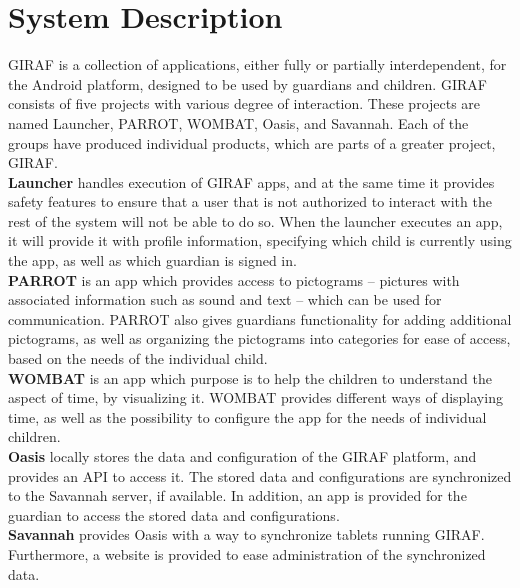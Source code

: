\section{System Description}
\label{common:sec:sys_description}
GIRAF is a collection of applications, either fully or partially interdependent, for the Android platform, designed to be used by guardians and children. GIRAF consists of five projects with various degree of interaction. These projects are named Launcher, PARROT, WOMBAT, Oasis, and Savannah. Each of the groups have produced individual products, which are parts of a greater project, GIRAF. \\

\textbf{Launcher} handles execution of GIRAF apps, and at the same time it provides safety features to ensure that a user that is not authorized to interact with the rest of the system will not be able to do so. When the launcher executes an app, it will provide it with profile information, specifying which child is currently using the app, as well as which guardian is signed in.\\

\textbf{PARROT} is an app which provides access to pictograms -- pictures with associated information such as sound and text -- which can be used for communication. PARROT also gives guardians functionality for adding additional pictograms, as well as organizing the pictograms into categories for ease of access, based on the needs of the individual child.\\

\textbf{WOMBAT} is an app which purpose is to help the children to understand the aspect of time, by visualizing it. WOMBAT provides different ways of displaying time, as well as the possibility to configure the app for the needs of individual children. \\

\textbf{Oasis} locally stores the data and configuration of the GIRAF platform, and provides an API to access it. The stored data and configurations are synchronized to the Savannah server, if available. In addition, an app is provided for the guardian to access the stored data and configurations.\\

\textbf{Savannah} provides Oasis with a way to synchronize tablets running GIRAF. Furthermore, a website is provided to ease administration of the synchronized data.